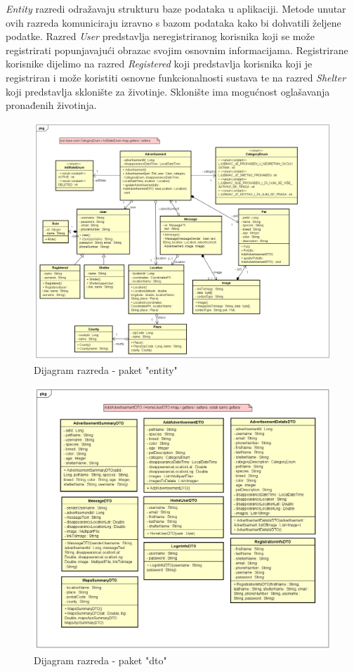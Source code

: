 \textit{Entity} razredi odražavaju strukturu baze podataka u aplikaciji. Metode unutar ovih razreda komuniciraju izravno s bazom podataka kako bi dohvatili željene podatke. Razred \textit{User} predstavlja neregistriranog korisnika koji se može registrirati popunjavajući obrazac svojim osnovnim informacijama. Registrirane korisnike dijelimo na razred \textit{Registered} koji predstavlja korisnika koji je registriran i može koristiti osnovne funkcionalnosti sustava te na razred \textit{Shelter} koji predstavlja sklonište za životinje. Sklonište ima mogućnost oglašavanja pronađenih životinja.

\begin{figure}[htb]
	\centering
	\includegraphics[width=\textwidth]{slike/dr3_entiteti.png}
	\caption{Dijagram razreda - paket "entity"}
\end{figure}
\pagebreak

\begin{figure}[htb]
	\centering
	\includegraphics[width=\textwidth]{slike/dr4_dto.png}
	\caption{Dijagram razreda - paket "dto"}
\end{figure}
\pagebreak


